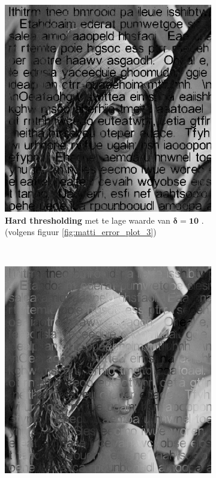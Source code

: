 \begin{figure}
    \centering
    \begin{subfigure}[b]{0.4\textwidth}
        \includegraphics[width=\textwidth]{../src/inpainting/lena_failed_4}
        \caption{ \textbf{Hard thresholding} met te lage waarde van $\mathbf{\delta = 10 }$ . (volgens figuur \ref{fig:matti_error_plot_3})}
        \label{fig:matti_failed_4}
    \end{subfigure}
    ~ %
    \begin{subfigure}[b]{0.4\textwidth}
        \includegraphics[width=\textwidth]{../src/inpainting/lena_optimal_4}

\end{subfigure}
\end{figure}

